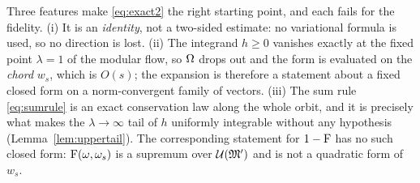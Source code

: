 \documentclass[11pt]{article}
\begin{document}
\begin{remark}
Three features make \eqref{eq:exact2} the right starting point, and each fails for the fidelity.
(i) It is an \emph{identity}, not a two-sided estimate: no variational formula is used, so no direction is
lost.  (ii) The integrand $h\ge0$ vanishes exactly at the fixed point $\lambda=1$ of the modular flow, so
$\Omega$ drops out and the form is evaluated on the \emph{chord} $w_s$, which is $O(s)$; the expansion is
therefore a statement about a fixed closed form on a norm-convergent family of vectors.  (iii) The sum rule
\eqref{eq:sumrule} is an exact conservation law along the whole orbit, and it is precisely what makes the
$\lambda\to\infty$ tail of $h$ uniformly integrable without any hypothesis
(Lemma~\ref{lem:uppertail}).  The corresponding statement for $1-\operatorname{F}$ has no such closed form:
$\operatorname{F}(\omega,\omega_s)$ is a supremum over $\mathcal U(\mathfrak M')$ and is not a quadratic form of $w_s$.
\end{remark}
\end{document}
